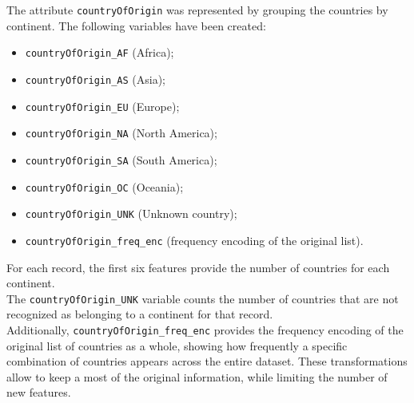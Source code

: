 The attribute \texttt{countryOfOrigin} was represented by grouping the countries by continent.
The following variables have been created: 
\begin{multicols}{2}
    \begin{itemize}
        \item \texttt{countryOfOrigin\_AF} (Africa);
        \item \texttt{countryOfOrigin\_AS} (Asia);
        \item \texttt{countryOfOrigin\_EU} (Europe);
        \item \texttt{countryOfOrigin\_NA} (North America);
        \item \texttt{countryOfOrigin\_SA} (South America);
        \item \texttt{countryOfOrigin\_OC} (Oceania);
        \item \texttt{countryOfOrigin\_UNK} (Unknown country);
        \item \texttt{countryOfOrigin\_freq\_enc} (frequency encoding of the original list).
    \end{itemize}
\end{multicols}


For each record, the first six features provide the number of countries for each continent.\\
The \texttt{countryOfOrigin\_UNK} variable counts the number of countries that are not recognized as belonging to a continent for that record.\\

Additionally, \texttt{countryOfOrigin\_freq\_enc} provides the frequency encoding of the original list of countries as a whole, 
showing how frequently a specific combination of countries appears across the entire dataset.
These transformations allow to keep a most of the original information, while limiting the number of new features.





